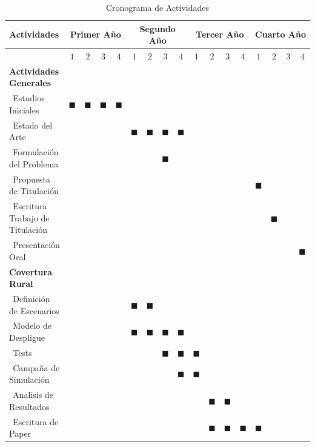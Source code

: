 \documentclass[12pt,a4paper]{article}
\begin{document}
\begin{table}[H]
\caption{Cronograma de Actividades}
\begin{center}
\begin{tabular}{|p{4.0cm}|c|c|c|c|c|c|c|c|c|c|c|c|c|c|c|c|}
\hline
Actividades &                  \multicolumn{ 4}{|c}{Primer Año} &                 \multicolumn{ 4}{|c}{Segundo Año} &                  \multicolumn{ 4}{|c}{Tercer Año} &                 \multicolumn{ 4}{|c|}{Cuarto Año} \\
\hline
 & $1$ & $2$ & $3$ & $4$ & $1$ & $2$ & $3$ & $4$ & $1$ & $2$ & $3$ & $4$ & $1$ & $2$ & $3$ & $4$ \\
\hline
\hline
\textbf{Actividades Generales}  &  &  &  &  &      &  &  &  &      &  &  &  &      &  &  &  \\ \hline
$~~$Estudios Iniciales    & $\blacksquare$ & $\blacksquare$ & $\blacksquare$ & $\blacksquare$ &      &  &  &  &      &  &  &  &      &  &  &  \\ \hline
$~~$Estado del Arte   &  &  &  &  &     $\blacksquare$ & $\blacksquare$ & $\blacksquare$ & $\blacksquare$ &      &  &  &  &      &  &  &  \\ \hline
$~~$Formulación del Problema   &  &  &  &  &      &  & $\blacksquare$ &  &      &  &  &  &      &  &  &  \\ \hline
$~~$Propuesta de Titulación   &  &  &  &  &      &  &  &  &      &  &  &  &     $\blacksquare$ &  &  &  \\ \hline
$~~$Escritura Trabajo de Titulación      &  &  &  &  &      &  &  &  &      &  &  &  &      & $\blacksquare$ &  &  \\ \hline
$~~$Presentación Oral      &  &  &  &  &      &  &  &  &      &  &  &  &      &  &  & $\blacksquare$ \\ \hline \hline

\textbf{Covertura Rural}      &  &  &  &  &      &  &  &  &      &  &  &  &      &  &  &  \\ \hline
$~~$Definición de Escenarios  &  &  &  &  &     $\blacksquare$ & $\blacksquare$ &  &  &      &  &  &  &      &  &  &  \\ \hline
$~~$Modelo de Despligue        &  &  &  &  &     $\blacksquare$ & $\blacksquare$ & $\blacksquare$ & $\blacksquare$ &      &  &  &  &      &  &  &  \\ \hline
$~~$Tests                    &  &  &  &  &      &  & $\blacksquare$ & $\blacksquare$ &     $\blacksquare$ &  &  &  &      &  &  &  \\ \hline
$~~$Campaña de Simulación     &  &  &  &  &      &  &  & $\blacksquare$ &     $\blacksquare$ &  &  &  &      &  &  &  \\ \hline
$~~$Analisis de Resultados      &  &  &  &  &      &  &  &  &      & $\blacksquare$ & $\blacksquare$ &  &      &  &  &  \\ \hline
$~~$Escritura de Paper        &  &  &  &  &      &  &  &  &      & $\blacksquare$ & $\blacksquare$ & $\blacksquare$ &     $\blacksquare$ &  &  &  \\ \hline \hline


\end{tabular}
\end{center}
\end{table}
\end{document}
